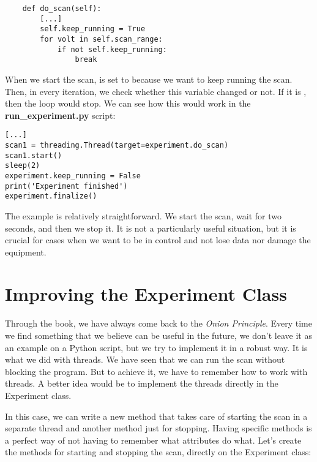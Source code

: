 \begin{verbatim}
    def do_scan(self):
        [...]
        self.keep_running = True
        for volt in self.scan_range:
            if not self.keep_running:
                break
\end{verbatim}
When we start the scan,  is set to  because we want to keep running the scan. Then, in every iteration, we check whether this variable changed or not. If it is , then the loop would stop. We can see how this would work in the \textbf{run\_experiment.py} script:

\begin{verbatim}
[...]
scan1 = threading.Thread(target=experiment.do_scan)
scan1.start()
sleep(2)
experiment.keep_running = False
print('Experiment finished')
experiment.finalize()
\end{verbatim}

The example is relatively straightforward. We start the scan, wait for two seconds, and then we stop it. It is not a particularly useful situation, but it is crucial for cases when we want to be in control and not lose data nor damage the equipment.


\section{Improving the Experiment Class}\label{sec:improving-experiment}
Through the book, we have always come back to the \emph{Onion Principle}. Every time we find something that we believe can be useful in the future, we don't leave it as an example on a Python script, but we try to implement it in a robust way. It is what we did with threads. We have seen that we can run the scan without blocking the program. But to achieve it, we have to remember how to work with threads. A better idea would be to implement the threads directly in the Experiment class.

In this case, we can write a new method that takes care of starting the scan in a separate thread and another method just for stopping. Having specific methods is a perfect way of not having to remember what attributes do what. Let's create the methods for starting and stopping the scan, directly on the Experiment class:

